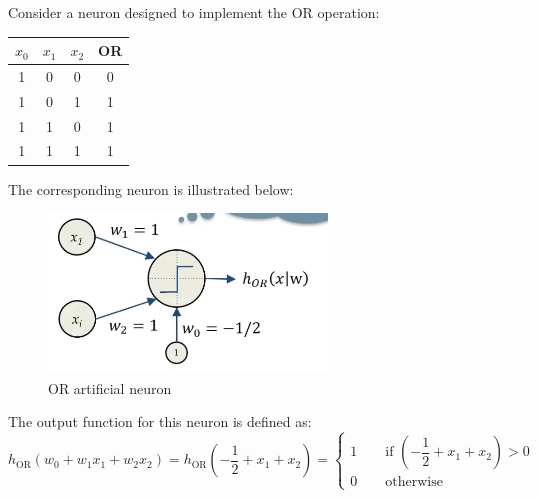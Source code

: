 \begin{example}
    Consider a neuron designed to implement the OR operation:
    \begin{table}[H]
        \centering
        \begin{tabular}{ccc|c}
        $x_0$ & $x_1$ & $x_2$ & \textbf{OR} \\ \hline
        1     & 0     & 0     & 0           \\
        1     & 0     & 1     & 1           \\
        1     & 1     & 0     & 1           \\
        1     & 1     & 1     & 1          
        \end{tabular}
    \end{table}
    The corresponding neuron is illustrated below:
    \begin{figure}[H]
        \centering
        \includegraphics[width=0.75\linewidth]{images/or.png}
        \caption{OR artificial neuron}
    \end{figure}
    The output function for this neuron is defined as:
    \[h_{\text{OR}}(w_0+w_1x_1+w_2x_2)=h_{\text{OR}}\left(-\dfrac{1}{2}+x_1+x_2\right)=\begin{cases} 1\qquad\text{if }\left(-\dfrac{1}{2}+x_1+x_2\right)>0 \\ 0\qquad\text{otherwise} \end{cases}\]


\end{example}
